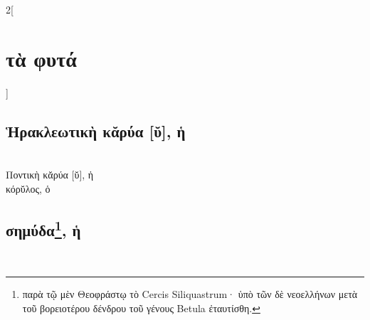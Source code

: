 \documentclass{book}
\begin{document}
\begin{multicols}{2}[\section{τὰ φυτά}]
\subsection{Ἡρακλεωτικὴ κᾰρύα [ῠ], ἡ}
  ~\\
Ποντικὴ κᾰρύα [ῠ], ἡ
  ~\\
κόρῠλος, ὁ
\subsection{σημύδα\textsuperscript{\textdagger}\protect\footnote{παρὰ 
τῷ μὲν Θεοφράστῳ τὸ Cercis Siliquastrum· 
ὑπὸ τῶν δὲ νεοελλήνων μετὰ τοῦ βορειοτέρου δένδρου τοῦ γένους Betula
 ἐταυτίσθη.}, ἡ}
~
\end{multicols}
\newpage  
\end{document}
